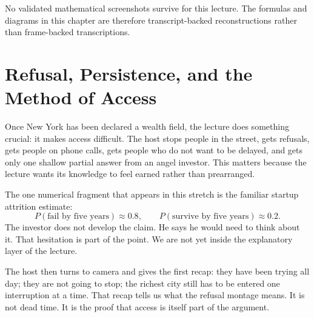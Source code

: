 \begin{remark}
No validated mathematical screenshots survive for this lecture. The formulas and diagrams in this chapter are therefore transcript-backed reconstructions rather than frame-backed transcriptions.
\end{remark}

\section{Refusal, Persistence, and the Method of Access}

Once New York has been declared a wealth field, the lecture does something crucial: it makes access difficult. The host stops people in the street, gets refusals, gets people on phone calls, gets people who do not want to be delayed, and gets only one shallow partial answer from an angel investor. This matters because the lecture wants its knowledge to feel earned rather than prearranged.

The one numerical fragment that appears in this stretch is the familiar startup attrition estimate:
\begin{equation}
P(\text{fail by five years})\approx 0.8,\qquad
P(\text{survive by five years})\approx 0.2.
\end{equation}
The investor does not develop the claim. He says he would need to think about it. That hesitation is part of the point. We are not yet inside the explanatory layer of the lecture.

The host then turns to camera and gives the first recap: they have been trying all day; they are not going to stop; the richest city still has to be entered one interruption at a time. That recap tells us what the refusal montage means. It is not dead time. It is the proof that access is itself part of the argument.

\begin{figure}
\centering
{}
\end{figure}


